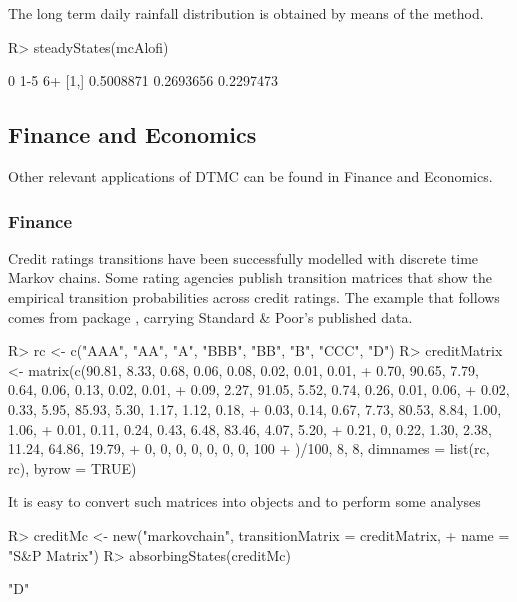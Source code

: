 \documentclass[nojss]{jss}
\begin{document}
The long term daily rainfall distribution is obtained by means of the  method.

\begin{Schunk}
\begin{Sinput}
R> steadyStates(mcAlofi)
\end{Sinput}
\begin{Soutput}
             0       1-5        6+
[1,] 0.5008871 0.2693656 0.2297473
\end{Soutput}
\end{Schunk}


\subsection{Finance and Economics}\label{app:fin}

Other relevant applications of DTMC can be found in Finance and Economics.

\subsubsection{Finance}\label{fin:fin}

Credit ratings transitions have been successfully modelled with discrete time Markov chains. Some rating agencies publish transition matrices that show the empirical transition probabilities across credit ratings. The example that follows 
comes from   package \citep{CreditMetricsR},
carrying Standard \& Poor's published data.

\begin{Schunk}
\begin{Sinput}
R> rc <- c("AAA", "AA", "A", "BBB", "BB", "B", "CCC", "D")
R> creditMatrix <- matrix(c(90.81, 8.33, 0.68, 0.06, 0.08, 0.02, 0.01, 0.01,
+  0.70, 90.65, 7.79, 0.64, 0.06, 0.13, 0.02, 0.01,
+  0.09, 2.27, 91.05, 5.52, 0.74, 0.26, 0.01, 0.06,
+  0.02, 0.33, 5.95, 85.93, 5.30, 1.17, 1.12, 0.18,
+  0.03, 0.14, 0.67, 7.73, 80.53, 8.84, 1.00, 1.06,
+  0.01, 0.11, 0.24, 0.43, 6.48, 83.46, 4.07, 5.20,
+  0.21, 0, 0.22, 1.30, 2.38, 11.24, 64.86, 19.79,
+  0, 0, 0, 0, 0, 0, 0, 100
+  )/100, 8, 8, dimnames = list(rc, rc), byrow = TRUE)
\end{Sinput}
\end{Schunk}

It is easy to convert such matrices into  objects and to perform some analyses

\begin{Schunk}
\begin{Sinput}
R> creditMc <- new("markovchain", transitionMatrix = creditMatrix, 
+                  name = "S&P Matrix")
R> absorbingStates(creditMc)
\end{Sinput}
\begin{Soutput}
[1] "D"
\end{Soutput}
\end{Schunk}
\end{document}
